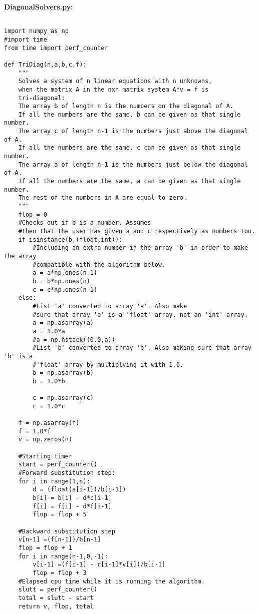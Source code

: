 \documentclass[11pt]{article}
\begin{document}
\vspace{4mm}
\noindent
\textbf{Diagonal\textunderscore Solvers.py:}

\begin{verbatim}

import numpy as np
#import time
from time import perf_counter

def TriDiag(n,a,b,c,f):
    """
    Solves a system of n linear equations with n unknowns,
    when the matrix A in the nxn matrix system A*v = f is 
    tri-diagonal: 
    The array b of length n is the numbers on the diagonal of A. 
    If all the numbers are the same, b can be given as that single number.
    The array c of length n-1 is the numbers just above the diagonal of A. 
    If all the numbers are the same, c can be given as that single number.
    The array a of length n-1 is the numbers just below the diagonal of A. 
    If all the numbers are the same, a can be given as that single number.
    The rest of the numbers in A are equal to zero.
    """
    flop = 0
    #Checks out if b is a number. Assumes
    #then that the user has given a and c respectively as numbers too.
    if isinstance(b,(float,int)):
	    #Including an extra number in the array 'b' in order to make the array
        #compatible with the algorithm below.
        a = a*np.ones(n-1)
        b = b*np.ones(n)
        c = c*np.ones(n-1)
    else:
        #List 'a' converted to array 'a'. Also make
        #sure that array 'a' is a 'float' array, not an 'int' array.
        a = np.asarray(a)
        a = 1.0*a
        #a = np.hstack((0.0,a))
        #List 'b' converted to array 'b'. Also making sure that array 'b' is a
        #'float' array by multiplying it with 1.0.
        b = np.asarray(b)
        b = 1.0*b
  
        c = np.asarray(c)
        c = 1.0*c

    f = np.asarray(f)
    f = 1.0*f	
    v = np.zeros(n)

    #Starting timer
    start = perf_counter()
    #Forward substitution step:
    for i in range(1,n):
        d = (float(a[i-1])/b[i-1])
        b[i] = b[i] - d*c[i-1]
        f[i] = f[i] - d*f[i-1]
        flop = flop + 5

    #Backward substitution step
    v[n-1] =(f[n-1])/b[n-1]
    flop = flop + 1
    for i in range(n-1,0,-1):
        v[i-1] =(f[i-1] - c[i-1]*v[i])/b[i-1]
        flop = flop + 3
    #Elapsed cpu time while it is running the algorithm.
    slutt = perf_counter()
    total = slutt - start
    return v, flop, total





\end{verbatim}
\end{document}
